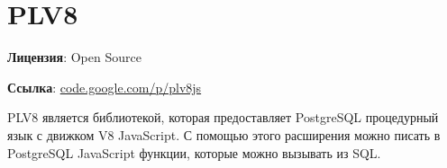 \section{PLV8}
\textbf{Лицензия}: Open Source

\textbf{Ссылка}: \href{http://code.google.com/p/plv8js/}{code.google.com/p/plv8js}

PLV8 является библиотекой, которая предоставляет PostgreSQL процедурный язык с движком V8 JavaScript. С помощью этого расширения можно писать в PostgreSQL JavaScript функции, которые можно вызывать из SQL.